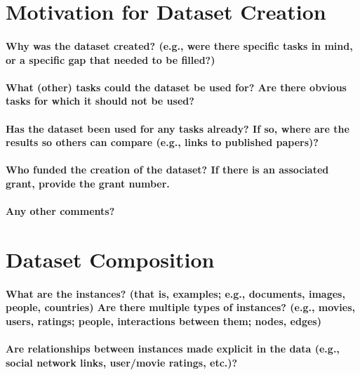 \documentclass{article}
\title{}
\author{}
\date{}
\begin{document}
\begin{multicols}{2}



\section{Motivation for Dataset Creation}

\paragraph{Why was the dataset created? (e.g., were there specific
tasks in mind, or a specific gap that needed to be filled?)}

\paragraph{What (other) tasks could the dataset be used for? Are
there obvious tasks for which it should not be used?}
\paragraph{Has the dataset been used for any tasks already? If so,
where are the results so others can compare (e.g., links to
published papers)?}
\paragraph{Who funded the creation of the dataset? If there is an
associated grant, provide the grant number.}
\paragraph{Any other comments?}

\section{Dataset Composition}
\paragraph{What are the instances? (that is, examples; e.g., documents, images, people, countries) Are there multiple types
of instances? (e.g., movies, users, ratings; people, interactions between them; nodes, edges)}
\paragraph{Are relationships between instances made explicit in
the data (e.g., social network links, user/movie ratings, etc.)?}

\end{multicols}
\end{document}
